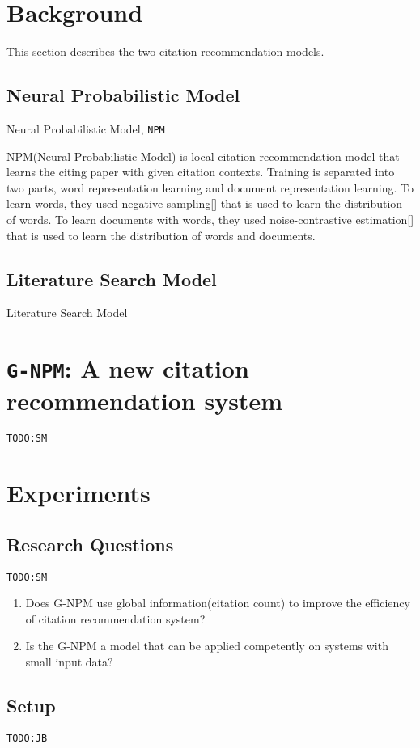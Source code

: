 \documentclass{llncs}
\newcommand{\name}{\texttt{G-NPM}\xspace}
\newcommand{\npm}{\texttt{NPM}\xspace}
\newcommand{\todo}[1]{\texttt{\color{red}TODO:#1}}
\begin{document}
\section{Background}
This section describes the two citation recommendation models.

\subsection{Neural Probabilistic Model}
Neural Probabilistic Model, \npm ~\cite{Huang:2015:NPM:2886521.2886655}

NPM(Neural Probabilistic Model) is local citation recommendation model that learns the citing paper with given citation contexts. Training is separated into two parts, word representation learning and document representation learning. To learn words, they used negative sampling[] that is used to learn the distribution of words. To learn documents with words, they used noise-contrastive estimation[] that is used to learn the distribution of words and documents.

\subsection{Literature Search Model}
Literature Search Model~\cite{Bethard:2010:ICL:1871437.1871517}

\section{\name: A new citation recommendation system}
\todo{SM}


\section{Experiments}
\subsection{Research Questions}
\todo{SM}

\begin{enumerate}
\item Does G-NPM use global information(citation count) to improve the efficiency of citation recommendation system?
\item Is the G-NPM a model that can be applied competently on systems with small input data?
\end{enumerate}
\subsection{Setup}
\todo{JB}
\end{document}
